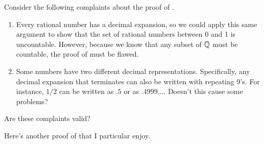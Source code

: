 \documentclass[11pt,twoside=off,numbers=noenddot]{scrbook}
\begin{document}
\begin{remark}
  Consider the following complaints about the proof of
  .

  \begin{enumerate}
    \item Every rational number has a decimal expansion, so we could
      apply this same argument to show that the set of rational
      numbers between 0 and 1 is uncountable. However, because we
      know that any subset of $\mathbb Q$ must be countable, the proof of
       must be flawed.
    \item Some numbers have two different decimal representations.
      Specifically, any decimal expansion that terminates can also be
      written with repeating 9's. For instance, $1/2$ can be written
      as $.5$ or as $.4999\dots$. Doesn't this cause some problems?
  \end{enumerate}

  Are these complaints valid?
\end{remark}

Here's another proof of 
that I particular enjoy.
\end{document}

